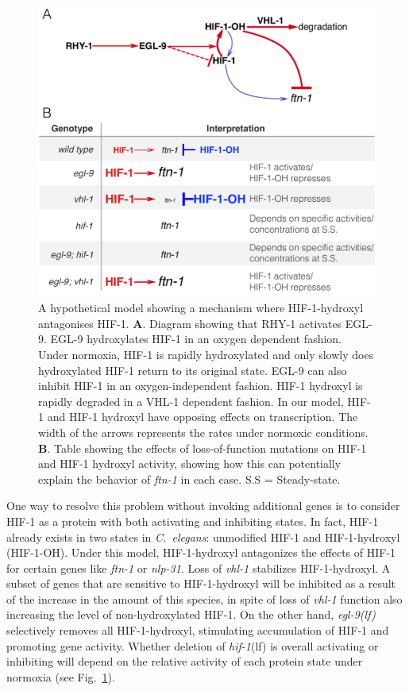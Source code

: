 \documentclass[10pt, onecolumn]{article}
\newcommand{\cel}{\emph{C.~elegans}}
\newcommand{\gene}[1]{\emph{#1}}
\newcommand{\nlp}{\emph{\mbox{nlp-31}}}
\newcommand{\ftna}{\emph{\mbox{ftn-1}}}
\newcommand{\egl}{\emph{\mbox{egl-9}(lf)}}
\newcommand{\hif}{\emph{\mbox{hif-1}}(lf)}
\newcommand{\hifp}{HIF-1}
\begin{document}
\begin{figure}[tbhp]
\centering
\includegraphics[width=.5\linewidth]{../figs/hif1oh_model.pdf}
\caption{
A hypothetical model showing a mechanism where \hifp{}-hydroxyl antagonises
\hifp{}.
\textbf{A}. Diagram showing that RHY-1 activates EGL-9.
EGL-9 hydroxylates HIF-1 in an oxygen dependent fashion. Under normoxia, HIF-1
is rapidly hydroxylated and only slowly does hydroxylated HIF-1 return to its
original state. EGL-9 can also inhibit HIF-1 in an oxygen-independent fashion.
HIF-1 hydroxyl is rapidly degraded in a VHL-1 dependent fashion. In our model,
HIF-1 and HIF-1 hydroxyl have opposing effects on transcription. The width of the
arrows represents the rates under normoxic conditions.
\textbf{B}. Table showing the effects of loss-of-function mutations on HIF-1 and
HIF-1 hydroxyl activity, showing how this can potentially explain the behavior
of \gene{ftn-1} in each case.  S.S = Steady-state.
}
\label{fig:hif1oh_table}
\end{figure}

One way to resolve this problem without invoking additional genes is to
consider \hifp{} as a protein with both activating and inhibiting states. In fact,
\hifp{} already exists in two states in \cel{}: unmodified \hifp{} and
\hifp{}-hydroxyl (\hifp{}-OH). Under this model, \hifp{}-hydroxyl antagonizes
the effects of \hifp{} for certain genes like \ftna{} or \nlp{}. Loss of
\gene{vhl-1} stabilizes \hifp{}-hydroxyl.
A subset of genes that are sensitive to \hifp{}-hydroxyl will be inhibited as a
result of the increase in the amount of this species, in spite of loss of
\gene{vhl-1} function also increasing the level of non-hydroxylated \hifp{}.
On the other hand, \egl{} selectively removes all \hifp{}-hydroxyl, stimulating
accumulation of \hifp{} and promoting gene activity. Whether deletion of \hif{}
is overall activating or inhibiting will depend on the relative activity of each
protein state under normoxia (see Fig.~\ref{fig:hif1oh_table}).
\end{document}
